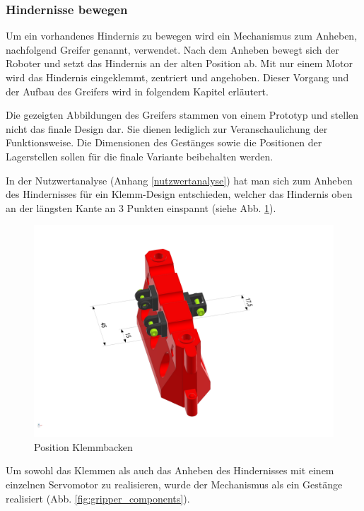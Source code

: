 \newpage

\subsubsection{Hindernisse bewegen}
\label{subsubsection:Hindernisse bewegen}

Um ein vorhandenes Hindernis zu bewegen wird ein Mechanismus zum Anheben, nachfolgend Greifer genannt, verwendet. Nach dem Anheben bewegt sich der Roboter und setzt das Hindernis an der alten Position ab.
Mit nur einem Motor wird das Hindernis eingeklemmt, zentriert und angehoben. Dieser Vorgang und der Aufbau des Greifers wird in folgendem Kapitel erläutert.

Die gezeigten Abbildungen des Greifers stammen von einem Prototyp und stellen nicht das finale Design dar. Sie dienen lediglich zur Veranschaulichung der Funktionsweise. Die Dimensionen des Gestänges sowie die Positionen der Lagerstellen sollen für die finale Variante beibehalten werden.

In der Nutzwertanalyse (Anhang \ref{nutzwertanalyse}) hat man sich zum Anheben des Hindernisses für ein Klemm-Design entschieden, welcher das Hindernis oben an der längsten Kante an 3 Punkten einspannt (siehe Abb. \ref{fig:obstacle_clamping_concept}). 


\begin{figure}[H]
\centering
\includegraphics[width=0.95\linewidth]{assets/greifer-prototyp/Greifer_Backen_Trimetric.png} 
\caption{Position Klemmbacken}
\label{fig:obstacle_clamping_concept}
\end{figure}

\newpage

Um sowohl das Klemmen als auch das Anheben des Hindernisses mit einem einzelnen Servomotor zu realisieren, wurde der Mechanismus als ein Gestänge realisiert (Abb. \ref{fig:gripper_components}).

